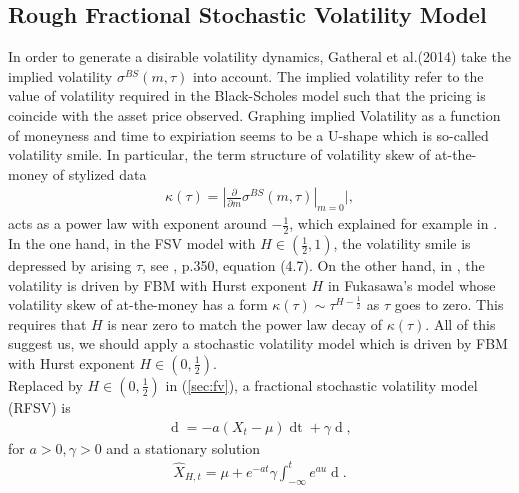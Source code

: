 \documentclass[a4paper, twoside, 11pt]{article}
\theoremstyle{definition}
\begin{document}
\subsection{Rough Fractional Stochastic Volatility Model}
In order to generate a disirable volatility dynamics, Gatheral et al.(2014) take the implied volatility $\sigma^{BS}(m, \tau)$ into account. The implied volatility refer to the value of volatility required in the Black-Scholes model such that the pricing is coincide with the asset price observed. Graphing implied Volatility as a function of moneyness and time to expiriation seems to be a U-shape which is so-called volatility smile. In particular, the term structure of volatility skew of at-the-money of stylized data
\begin{eqnarray*}
  \kappa(\tau)=|\frac{\partial}{\partial m}\sigma^{BS}(m, \tau)|_{m=0}|,
\end{eqnarray*}
acts as a power law with exponent around $-\frac{1}{2}$, which explained for example in \cite{gradin}. In the one hand, in the FSV model with $H \in (\frac{1}{2}, 1)$, the volatility smile is depressed by arising $\tau$, see \cite{comteetla}, p.350, equation (4.7). On the other hand,  in \cite{fukasawa}, the volatility is driven by FBM with Hurst exponent $H$ in Fukasawa's model whose volatility skew of at-the-money has a form $\kappa(\tau) \sim \tau^{H-\frac{1}{2}}$ as $\tau$ goes to zero. This requires that $H$ is near zero to match the power law decay of $\kappa(\tau)$.  All of this suggest us, we should apply a stochastic volatility model which is driven by FBM with Hurst exponent $H \in (0, \frac{1}{2})$.\\
Replaced by $H \in (0, \frac{1}{2})$ in (\ref{sec:fv}), a fractional stochastic volatility model (RFSV) is
\begin{eqnarray}
  \mathop{dX_t} = -a(X_t - \mu)\mathop{dt} + \gamma \mathop{dU_H(t)},
  \label{sec:rfm}
\end{eqnarray}
for $a>0, \gamma>0$ and a stationary solution
\begin{eqnarray}
\hat{X}_{H,t}=\mu + e^{-at}\gamma\int_{-\infty}^t e^{au}\mathop{dU_H(u)}.
\label{sec:rfm2}
\end{eqnarray}
\end{document}
